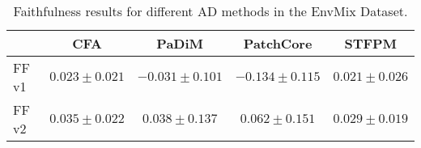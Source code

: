 \begin{table}[htb]
\centering
\caption{Faithfulness results for different AD methods in the EnvMix Dataset.}
\label{tab:ff}
\begin{tabular}{l|c c c c}
\toprule
 & CFA & PaDiM & PatchCore & STFPM \\ 
\midrule
FF v1 & \( 0.023 \pm 0.021 \) & \( -0.031 \pm 0.101 \) & \( -0.134 \pm 0.115 \) & \( 0.021 \pm 0.026 \) \\  
FF v2 & \( 0.035 \pm 0.022 \) & \( 0.038 \pm 0.137 \) & \( 0.062 \pm 0.151 \) & \( 0.029 \pm 0.019 \) \\  
\bottomrule
\end{tabular}
\end{table}